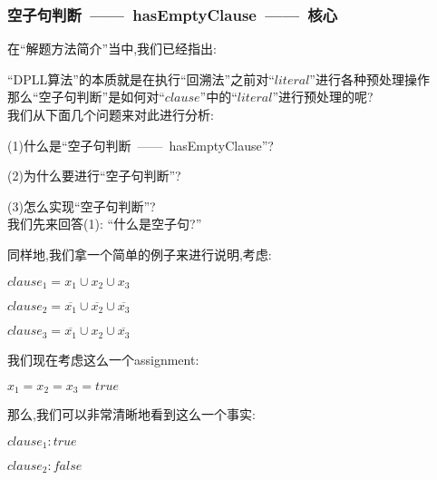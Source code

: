         \subsubsection{空子句判断\ ——\ hasEmptyClause\ ——\ 核心}
        \noindent
        在``解题方法简介''当中,我们已经指出:
        \par
            ``DPLL算法''的本质就是在执行``回溯法''之前对``$literal$''进行各种预处理操作
        \\
        \noindent
        \newline
            那么``空子句判断''是如何对``$clause$''中的``$literal$''进行预处理的呢?
        \\
        \noindent
        \newline
        我们从下面几个问题来对此进行分析:\\
            \par
            (1)什么是``空子句判断\ ——\ hasEmptyClause''?\par
            (2)为什么要进行``空子句判断''?\par
            (3)怎么实现``空子句判断''?\\
        \newline
        我们先来回答(1):   ``什么是空子句?''\\
        \par
        同样地,我们拿一个简单的例子来进行说明,考虑:
        \begin{center}
            $clause_{1} = x_{1} \cup x_{2} \cup x_{3}$
        \end{center}
        \begin{center}
            $clause_{2} = \overline{x_{1}} \cup \overline{x_{2}} \cup \overline{x_{3}}$
        \end{center}
        \begin{center}
            $clause_{3} = \overline{x_{1}} \cup x_{2} \cup \overline{x_{3}}$
        \end{center}
        \par
        我们现在考虑这么一个assignment:
        \begin{center}
            $x_{1}=x_{2}=x_{3}=true$
        \end{center}
        \par
        那么,我们可以非常清晰地看到这么一个事实:
        \begin{center}
            $clause_{1}:true$
        \end{center}
        \begin{center}
            $clause_{2}:false$
        \end{center}

